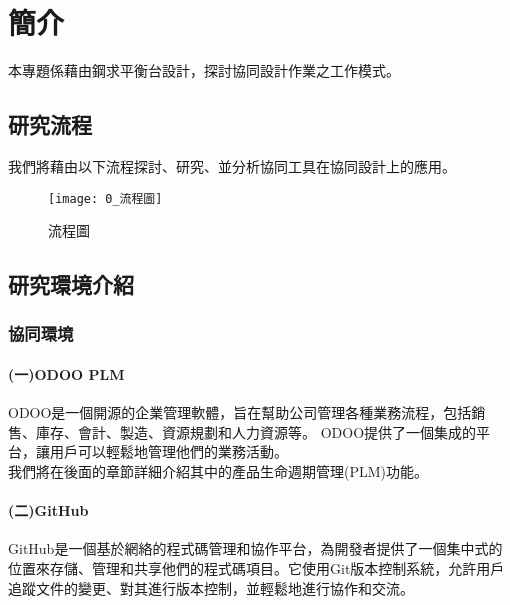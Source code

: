 \chapter{簡介}
\renewcommand{\baselinestretch}{10.0} %
\setcounter{page}{1}  %
\fontsize{14pt}{2.5pt}\sectionef

本專題係藉由鋼求平衡台設計，探討協同設計作業之工作模式。

\section{研究流程}
我們將藉由以下流程探討、研究、並分析協同工具在協同設計上的應用。\\

\begin{figure}[hbt!]
\center
\texttt{[image: 0\_流程圖]}
\caption{\Large 流程圖}\label{0_流程圖}
\end{figure}
\newpage
\section{研究環境介紹}
\subsection{協同環境}
\fontsize{14pt}{2.5pt}\sectionef\hspace{12pt} 
\subsubsection{(一)ODOO PLM}
\fontsize{14pt}{2.5pt}\sectionef\hspace{12pt} ODOO是一個開源的企業管理軟體，旨在幫助公司管理各種業務流程，包括銷售、庫存、會計、製造、資源規劃和人力資源等。
ODOO提供了一個集成的平台，讓用戶可以輕鬆地管理他們的業務活動。\\
\fontsize{14pt}{2.5pt}\sectionef\hspace{12pt}
我們將在後面的章節詳細介紹其中的產品生命週期管理(PLM)功能。\\
\subsubsection{(二)GitHub}
GitHub是一個基於網絡的程式碼管理和協作平台，為開發者提供了一個集中式的位置來存儲、管理和共享他們的程式碼項目。它使用Git版本控制系統，允許用戶追蹤文件的變更、對其進行版本控制，並輕鬆地進行協作和交流。\\

